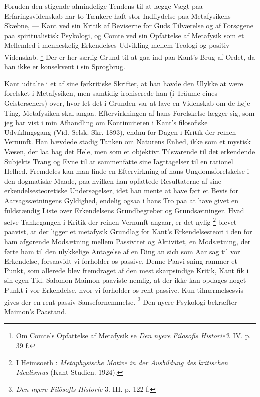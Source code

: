 \documentclass[12pt]{article}
\newcommand{\apage}[1]{\marginnote{\footnotesize\textit{[#1]}}}
\begin{document}
Foruden den stigende almindelige Tendens til at lægge Vægt paa
Erfaringsvidenskab har to Tænkere haft stor Indflydelse paa
\guillemotright{}Metafysikens\guillemotleft{} Skæbne, --- Kant ved sin Kritik
af Beviserne for Guds Tilværelse og af Forsøgene paa spiritualistisk Psykologi,
og Comte ved sin Opfattelse af \guillemotright{}Metafysik\guillemotleft{} som
et Mellemled i menneskelig Erkendelses Udvikling mellem Teologi og positiv Videnskab.
      \footnote{Om Comte's Opfattelse af
\guillemotright{}Metafysik\guillemotleft{} se \textit{Den nyere Filosofis
Historie3}. IV. p. 39 f.} %
 Der er her særlig Grund til at gaa ind paa Kant's Brug af Ordet, da han ikke
er konsekvent i sin Sprogbrug.

Kant udtalte i et af sine førkritiske Skrifter, at han havde den Ulykke at være
forelsket i Metafysiken, men samtidig ironiserede han (i
\guillemotright{}Träume eines Geistersehers\guillemotleft{}) over, hvor let
det i Grunden var at lave en Videnskab om de høje Ting, Metafysiken skal angaa.
Eftervirkningen af hans Forelskelse lægger sig, som jeg har vist i min
Afhandling om \guillemotright{}Kontinuiteten i Kant's filosofiske
Udviklingsgang\guillemotleft{} (Vid. Selsk. Skr. 1893), endnu for Dagen i
\guillemotright{}Kritik der reinen Vernunft\guillemotleft{}. Han hævdede stadig
Tanken om Naturens Enhed, ikke som et mystisk Væsen, der laa bag det Hele, men
som et objektivt Tilsvarende til det erkendende Subjekts Trang og Evne til at
sammenfatte sine Iagttagelser til en rationel Helhed. Fremdeles kan man finde
en Eftervirkning af hans Ungdomsforelskelse i den dogmatiske Maade, paa hvilken
han opfattede Resultaterne af sine erkendelsesteoretiske Undersøgelser, idet
han mente at have ført et Bevis for Aarsagssætningens Gyldighed, endelig ogsaa
i hans Tro paa at have givet en fuldstændig Liste over Erkendelsens
Grundbegreber og Grundsætninger. Hvad selve Tankegangen i
\guillemotright{}Kritik der reinen Vernunft\guillemotleft{} angaar, er det nylig
      \footnote{I Heimsoeth : \textit{Metaphysische Motive in der Ausbildung
des kritischen Idealismus} (Kant-Studien. 1924).} %
 blevet paavist, at der ligger et \guillemotright{}metafysik\guillemotleft{}
Grundlag for Kant's Erkendelsesteori i den for ham afgørende Modsætning
\setcounter{footnote}{0}%
\apage{87}mellem Passivitet og Aktivitet, en Modsætning, der førte ham til den
ulykkelige Antagelse af en \guillemotright{}Ding an sich\guillemotleft{} som
Aar sag til vor Erkendelse, forsaavidt vi forholder os passive. Denne Paavi
sning rammer et Punkt, som allerede blev fremdraget af den mest skarpsindige
Kritik, Kant fik i sin egen Tid. Salomon Maimon paaviste nemlig, at der ikke
kan opdages noget Punkt i vor Erkendelse, hvor vi forholder os rent passive.
Kun tilnærmelsesvis gives der en rent passiv Sansefornemmelse.
      \footnote{\textit{Den nyere Filösofls Historie }3. III. p. 122 f.} %
 Den nyere Psykologi bekræfter Maimon's Paastand.
\end{document}
